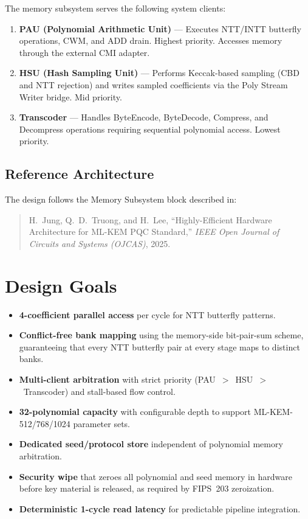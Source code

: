 \documentclass[11pt,letterpaper]{article}
\begin{document}
The memory subsystem serves the following system clients:

\begin{enumerate}[label=\arabic*.]
  \item \textbf{PAU (Polynomial Arithmetic Unit)} --- Executes NTT/INTT
    butterfly operations, CWM, and ADD drain. Highest priority. Accesses
    memory through the external CMI adapter.
  \item \textbf{HSU (Hash Sampling Unit)} --- Performs Keccak-based
    sampling (CBD and NTT rejection) and writes sampled coefficients via
    the Poly Stream Writer bridge. Mid priority.
  \item \textbf{Transcoder} --- Handles ByteEncode, ByteDecode, Compress,
    and Decompress operations requiring sequential polynomial access.
    Lowest priority.
\end{enumerate}

\subsection{Reference Architecture}

The design follows the Memory Subsystem block described in:

\begin{quote}
  H.~Jung, Q.~D.~Truong, and H.~Lee, ``Highly-Efficient Hardware
  Architecture for ML-KEM PQC Standard,'' \emph{IEEE Open Journal of
  Circuits and Systems (OJCAS)}, 2025.
\end{quote}

\section{Design Goals}
\label{sec:goals}

\begin{itemize}
  \item \textbf{4-coefficient parallel access} per cycle for NTT butterfly
    patterns.
  \item \textbf{Conflict-free bank mapping} using the memory-side
    bit-pair-sum scheme, guaranteeing that every NTT butterfly pair at
    every stage maps to distinct banks.
  \item \textbf{Multi-client arbitration} with strict priority
    (PAU~$>$~HSU~$>$~Transcoder) and stall-based flow control.
  \item \textbf{32-polynomial capacity} with configurable depth to support
    ML-KEM-512/768/1024 parameter sets.
  \item \textbf{Dedicated seed/protocol store} independent of polynomial
    memory arbitration.
  \item \textbf{Security wipe} that zeroes all polynomial and seed memory
    in hardware before key material is released, as required by
    FIPS~203 zeroization.
  \item \textbf{Deterministic 1-cycle read latency} for predictable
    pipeline integration.
\end{itemize}
\end{document}
